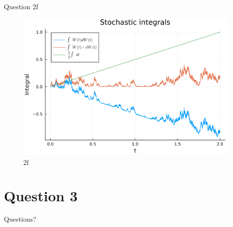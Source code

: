 \documentclass[compress,12pt]{beamer}
\begin{document}
\begin{frame}{Question 2f}
      \begin{figure}[H]
            \centering
            \includegraphics[scale=0.5]{imgs/2f.png}
            \caption{2f}
            \label{fig:2f}
      \end{figure}

\end{frame}

\section{Question 3}




\End
\begin{frame}
      \centering
      Questions?
\end{frame}
\end{document}
